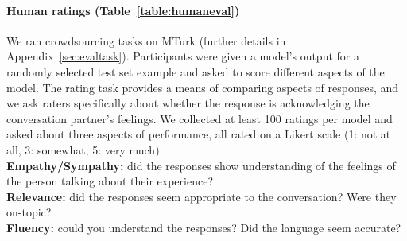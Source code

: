 \documentclass[11pt,a4paper]{article}
\begin{document}
\paragraph{Human ratings (Table~\ref{table:humaneval})} We ran crowdsourcing tasks on MTurk (further details in Appendix~\ref{sec:evaltask}). Participants were given a model's output for a randomly selected test set example and asked to score different aspects of the model. The rating task provides a means of comparing aspects of responses, and we ask raters specifically about whether the response is acknowledging the conversation partner's feelings. We collected at least 100 ratings per model and asked about three aspects of performance, all rated on a Likert scale (1: not at all, 3: somewhat, 5: very much):
\\
\hspace*{.2cm}\textbf{ Empathy/Sympathy:} did the responses show understanding of the feelings of the person talking about their experience? \\
\hspace*{.2cm}\textbf{ Relevance:} did the responses seem appropriate to the conversation?  Were they on-topic? \\
\hspace*{.2cm}\textbf{ Fluency:} could you understand the responses?  Did the language seem accurate?
\\


\end{document}
